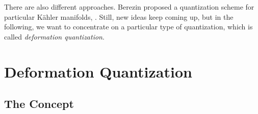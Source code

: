 There are also different approaches. Berezin proposed a quantization scheme for 
particular K\"ahler manifolds, \cite{berezin:1975a, berezin:1975b, berezin:1975c}. 
Still, new ideas keep coming up, but in the following, we want to concentrate on a 
particular type of quantization, which is called \emph{deformation quantization}.



\section{Deformation Quantization}
\label{sec:chap2_DQ}

\subsection{The Concept}
\label{subsec:chap2_Concept}

